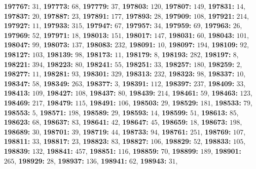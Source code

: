 \textsf{\bfseries 197767:} $31$, \textsf{\bfseries 197773:} $68$, \textsf{\bfseries 197779:} $37$, \textsf{\bfseries 197803:} $120$, \textsf{\bfseries 197807:} $149$, \textsf{\bfseries 197831:} $14$, \textsf{\bfseries 197837:} $20$, \textsf{\bfseries 197887:} $23$, \textsf{\bfseries 197891:} $177$, \textsf{\bfseries 197893:} $28$, \textsf{\bfseries 197909:} $108$, \textsf{\bfseries 197921:} $214$, \textsf{\bfseries 197927:} $11$, \textsf{\bfseries 197933:} $315$, \textsf{\bfseries 197947:} $67$, \textsf{\bfseries 197957:} $34$, \textsf{\bfseries 197959:} $69$, \textsf{\bfseries 197963:} $26$, \textsf{\bfseries 197969:} $52$, \textsf{\bfseries 197971:} $18$, \textsf{\bfseries 198013:} $151$, \textsf{\bfseries 198017:} $147$, \textsf{\bfseries 198031:} $60$, \textsf{\bfseries 198043:} $101$, \textsf{\bfseries 198047:} $99$, \textsf{\bfseries 198073:} $137$, \textsf{\bfseries 198083:} $232$, \textsf{\bfseries 198091:} $10$, \textsf{\bfseries 198097:} $194$, \textsf{\bfseries 198109:} $92$, \textsf{\bfseries 198127:} $103$, \textsf{\bfseries 198139:} $98$, \textsf{\bfseries 198173:} $11$, \textsf{\bfseries 198179:} $8$, \textsf{\bfseries 198193:} $282$, \textsf{\bfseries 198197:} $8$, \textsf{\bfseries 198221:} $394$, \textsf{\bfseries 198223:} $80$, \textsf{\bfseries 198241:} $55$, \textsf{\bfseries 198251:} $33$, \textsf{\bfseries 198257:} $180$, \textsf{\bfseries 198259:} $2$, \textsf{\bfseries 198277:} $11$, \textsf{\bfseries 198281:} $93$, \textsf{\bfseries 198301:} $329$, \textsf{\bfseries 198313:} $232$, \textsf{\bfseries 198323:} $98$, \textsf{\bfseries 198337:} $10$, \textsf{\bfseries 198347:} $58$, \textsf{\bfseries 198349:} $263$, \textsf{\bfseries 198377:} $3$, \textsf{\bfseries 198391:} $112$, \textsf{\bfseries 198397:} $237$, \textsf{\bfseries 198409:} $33$, \textsf{\bfseries 198413:} $109$, \textsf{\bfseries 198427:} $108$, \textsf{\bfseries 198437:} $80$, \textsf{\bfseries 198439:} $214$, \textsf{\bfseries 198461:} $59$, \textsf{\bfseries 198463:} $123$, \textsf{\bfseries 198469:} $217$, \textsf{\bfseries 198479:} $115$, \textsf{\bfseries 198491:} $106$, \textsf{\bfseries 198503:} $29$, \textsf{\bfseries 198529:} $181$, \textsf{\bfseries 198533:} $79$, \textsf{\bfseries 198553:} $5$, \textsf{\bfseries 198571:} $198$, \textsf{\bfseries 198589:} $29$, \textsf{\bfseries 198593:} $14$, \textsf{\bfseries 198599:} $51$, \textsf{\bfseries 198613:} $85$, \textsf{\bfseries 198623:} $68$, \textsf{\bfseries 198637:} $83$, \textsf{\bfseries 198641:} $42$, \textsf{\bfseries 198647:} $45$, \textsf{\bfseries 198659:} $18$, \textsf{\bfseries 198673:} $198$, \textsf{\bfseries 198689:} $30$, \textsf{\bfseries 198701:} $39$, \textsf{\bfseries 198719:} $44$, \textsf{\bfseries 198733:} $94$, \textsf{\bfseries 198761:} $251$, \textsf{\bfseries 198769:} $107$, \textsf{\bfseries 198811:} $33$, \textsf{\bfseries 198817:} $23$, \textsf{\bfseries 198823:} $83$, \textsf{\bfseries 198827:} $106$, \textsf{\bfseries 198829:} $52$, \textsf{\bfseries 198833:} $105$, \textsf{\bfseries 198839:} $132$, \textsf{\bfseries 198841:} $457$, \textsf{\bfseries 198851:} $116$, \textsf{\bfseries 198859:} $70$, \textsf{\bfseries 198899:} $189$, \textsf{\bfseries 198901:} $265$, \textsf{\bfseries 198929:} $28$, \textsf{\bfseries 198937:} $136$, \textsf{\bfseries 198941:} $62$, \textsf{\bfseries 198943:} $31$, 
